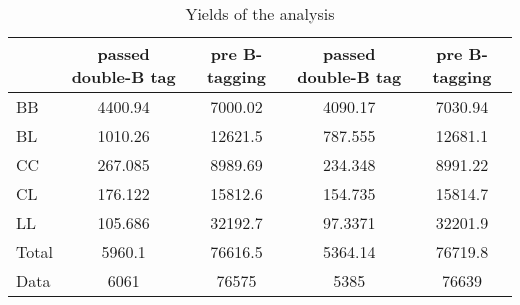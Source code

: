 \documentclass[10pt]{article}
\begin{document}
\begin{table}[htbp]
\begin{center}
\begin{tabular}{|l|S|S|S|S|}
\hline 
 & {passed double-B tag} & {pre B-tagging} & {passed double-B tag} & {pre B-tagging}\\
\hline 
  BB   & 4400.94  & 7000.02  & 4090.17  & 7030.94  \\ 
  BL   & 1010.26  & 12621.5  & 787.555  & 12681.1  \\ 
  CC   & 267.085  & 8989.69  & 234.348  & 8991.22  \\ 
  CL   & 176.122  & 15812.6  & 154.735  & 15814.7  \\ 
  LL   & 105.686  & 32192.7  & 97.3371  & 32201.9  \\ 
\hline 
  Total  & 5960.1  & 76616.5  & 5364.14  & 76719.8  \\ 
\hline 
  Data   & 6061 & 76575 & 5385 & 76639 \\ 
\hline 
\end{tabular} 
\caption{Yields of the analysis} 
\end{center} 
\end{table} 
\end{document}
